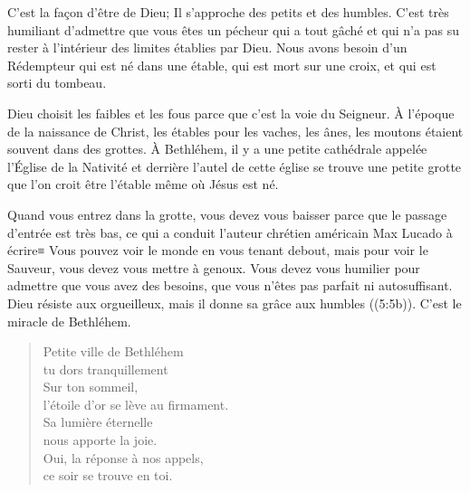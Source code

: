 C'est la façon d'être de Dieu; Il s'approche des petits et des humbles. C'est très humiliant d'admettre que vous êtes un pécheur qui a tout gâché et qui n'a pas su rester à l'intérieur des limites établies par Dieu. Nous avons besoin d'un Rédempteur qui est né dans une étable, qui est mort sur une croix, et qui est sorti du tombeau.

Dieu choisit les faibles et les fous parce que c'est la voie du Seigneur. À l'époque de la naissance de Christ, les étables pour les vaches, les ânes, les moutons étaient souvent dans des grottes. À Bethléhem, il y a une petite cathédrale appelée l'Église de la Nativité et derrière l'autel de cette église se trouve une petite grotte que l'on croit être l'étable même où Jésus est né.

Quand vous entrez dans la grotte, vous devez vous baisser parce que le passage d'entrée est très bas, ce qui a conduit l'auteur chrétien américain Max Lucado à écrire≡ \og Vous pouvez voir le monde en vous tenant debout, mais pour voir le Sauveur, vous devez vous mettre à genoux. Vous devez vous humilier pour admettre que vous avez des besoins, que vous n'êtes pas parfait ni autosuffisant. \fg{} \og Dieu résiste aux orgueilleux, mais il donne sa grâce aux humbles \fg{} ((5:5b)). C'est le miracle de Bethléhem.


\ornrule

\begin{verse}
\begin{altverse}
Petite ville de Bethléhem\\
tu dors tranquillement\\
Sur ton sommeil,\\
l'étoile d'or se lève au firmament.\\
Sa lumière éternelle\\
nous apporte la joie.\\
Oui, la réponse à nos appels,\\
ce soir se trouve en toi.
\end{altverse}
\end{verse}
